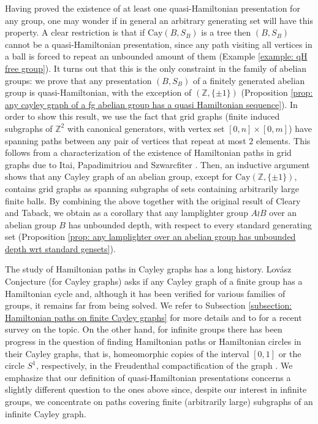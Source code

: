 \documentclass[reqno,oneside]{amsart}
\newcommand{\cay}[2]{\mathrm{Cay}(#1,#2)}
\newcommand{\Z}{\mathbb{Z}}
\theoremstyle{plain}
\theoremstyle{definition}
\begin{document}
Having proved the existence of at least one quasi-Hamiltonian presentation for any group, one may wonder if in general an arbitrary generating set will have this property. A clear restriction is that if $\cay{B}{S_B}$ is a tree then $(B,S_B)$ cannot be a quasi-Hamiltonian presentation, since any path visiting all vertices in a ball is forced to repeat an unbounded amount of them (Example \ref{example: qH free group}). It turns out that this is the only constraint in the family of abelian groups: we prove that any presentation $(B,S_B)$ of a finitely generated abelian group is quasi-Hamiltonian, with the exception of $(\Z,\{\pm 1\})$ (Proposition \ref{prop: any cayley graph of a fg abelian group has a quasi Hamiltonian sequence}).  In order to show this result, we use the fact that grid graphs (finite induced subgraphs of $\Z^2$ with canonical generators, with vertex set $[0,n]\times[0,m]$) have spanning paths between any pair of vertices that repeat at most $2$ elements. This follows from a characterization of the existence of Hamiltonian paths in grid graphs due to Itai, Papadimitriou and Szwarcfiter \cite{ItaiPapadimitriouSzwarcfiter1982}. Then, an inductive argument shows that any Cayley graph of an abelian group, except for $\cay{\Z}{\{\pm 1\}}$, contains grid graphs as spanning subgraphs of sets containing arbitrarily large finite balls. By combining the above together with the original result of Cleary and Taback, we obtain as a corollary that any lamplighter group $A\wr B$ over an abelian group $B$ has unbounded depth, with respect to every standard generating set (Proposition \ref{prop: any lamplighter over an abelian group has unbounded depth wrt standard gensets}).


The study of Hamiltonian paths in Cayley graphs has a long history. Lovász Conjecture (for Cayley graphs) asks if any Cayley graph of a finite group has a Hamiltonian cycle and, although it has been verified for various families of groups, it remains far from being solved. We refer to Subsection \ref{subsection: Hamiltonian paths on finite Cayley graphs} for more details and to \cite{LanelPallageRatnayakeThevashaWelihinda2019} for a recent survey on the topic. On the other hand, for infinite groups there has been progress in the question of finding Hamiltonian paths or Hamiltonian circles in their Cayley graphs, that is, homeomorphic copies of the interval $[0,1]$ or the circle $S^1$, respectively, in the Freudenthal compactification of the graph \cite{MiraftabRuhmann2018}. We emphasize that our definition of quasi-Hamiltonian presentations concerns a slightly different question to the ones above since, despite our interest in infinite groups, we concentrate on paths covering finite (arbitrarily large) subgraphs of an infinite Cayley graph.
\end{document}
